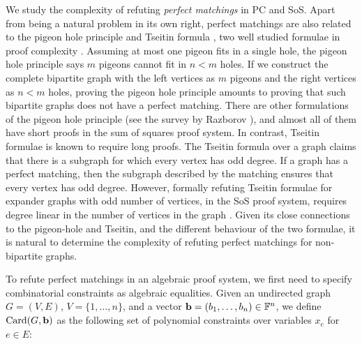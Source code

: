 \documentclass[11pt]{article}
\begin{document}
We study the complexity of refuting \emph{perfect matchings} in PC and SoS.
Apart from being a natural problem in its own right, perfect matchings are also related to the pigeon hole principle \citep{razbarov2002pgp} and Tseitin formula \citep{grigoriev2001linear}, two well studied formulae in proof complexity .
Assuming at most one pigeon fits in a single hole, the pigeon hole principle says $m$ pigeons cannot fit in $n < m$ holes.
If we construct the complete bipartite graph with the left vertices as $m$ pigeons and the right vertices as $n < m$ holes, proving the pigeon hole principle amounts to proving that such bipartite graphs does not have a perfect matching.
There are other formulations of the pigeon hole principle (see the survey by Razborov \citep{razbarov2002pgp}), and almost all of them have short proofs in the sum of squares proof system.
In contrast, Tseitin formulae is known to require long proofs. The Tseitin formula over a graph claims that there is a subgraph for which every vertex has odd degree.
If a graph has a perfect matching, then the subgraph described by the matching ensures that every vertex has odd degree.
However, formally refuting Tseitin formulae for expander graphs with odd number of vertices, in the SoS proof system, requires degree linear in the number of vertices in the graph \cite{grigoriev2001linear}.
Given its close connections to the pigeon-hole and Tseitin, and the different behaviour of the two formulae, it is natural to determine the complexity of refuting perfect matchings for non-bipartite graphs.

\par
To refute perfect matchings in an algebraic proof system, we first need to specify combinatorial constraints as algebraic equalities. Given an undirected graph $G=(V,E)$, $V = \{1, \ldots, n\}$, and a vector $\mathbf{b} = (b_1, \ldots, b_{n}) \in \mathbb{F}^{n}$,
we define $\text{Card}(G, \mathbf{b})$ as the following set of polynomial constraints over variables $x_e$ for $e \in E$:
\end{document}
